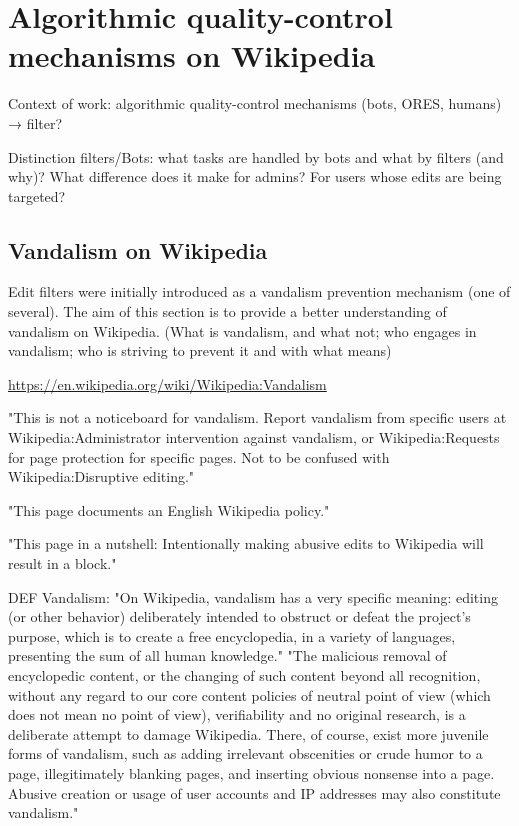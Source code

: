 \documentclass{sigchi}
\begin{document}
\section{Algorithmic quality-control mechanisms on Wikipedia}
Context of work: algorithmic quality-control mechanisms (bots, ORES, humans) → filter?

Distinction filters/Bots: what tasks are handled by bots and what by filters (and why)? What difference does it make for admins? For users whose edits are being targeted?

\subsection{Vandalism on Wikipedia}

Edit filters were initially introduced as a vandalism prevention mechanism (one of several).
The aim of this section is to provide a better understanding of vandalism on Wikipedia. (What is vandalism, and what not; who engages in vandalism; who is striving to prevent it and with what means)

\url{https://en.wikipedia.org/wiki/Wikipedia:Vandalism}

"This is not a noticeboard for vandalism. Report vandalism from specific users at Wikipedia:Administrator intervention against vandalism, or Wikipedia:Requests for page protection for specific pages.
Not to be confused with Wikipedia:Disruptive editing."

"This page documents an English Wikipedia policy."

"This page in a nutshell: Intentionally making abusive edits to Wikipedia will result in a block."

DEF Vandalism:
"On Wikipedia, vandalism has a very specific meaning: editing (or other behavior) deliberately intended to obstruct or defeat the project's purpose, which is to create a free encyclopedia, in a variety of languages, presenting the sum of all human knowledge."
"The malicious removal of encyclopedic content, or the changing of such content beyond all recognition, without any regard to our core content policies of neutral point of view (which does not mean no point of view), verifiability and no original research, is a deliberate attempt to damage Wikipedia. There, of course, exist more juvenile forms of vandalism, such as adding irrelevant obscenities or crude humor to a page, illegitimately blanking pages, and inserting obvious nonsense into a page. Abusive creation or usage of user accounts and IP addresses may also constitute vandalism."
\end{document}
